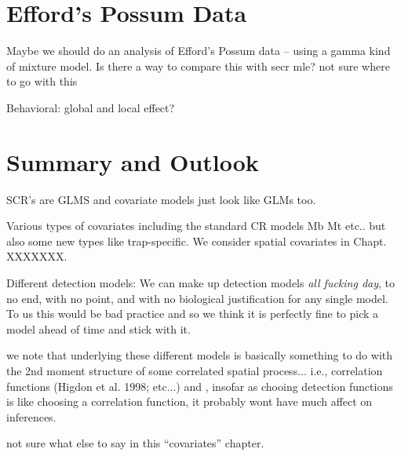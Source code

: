\section{Efford's Possum Data}

Maybe we should do an analysis of Efford's Possum data -- using a
gamma kind of mixture model.  Is there a way to compare this with secr
mle?
not sure where to go with this


Behavioral: global and local effect?


\section{Summary and Outlook}


SCR's are GLMS and covariate models just look like GLMs too.

Various types of covariates including the standard CR models Mb Mt etc..
but also some new types like trap-specific. We consider spatial covariates
in Chapt. XXXXXXX.


Different detection models: We can make up detection models {\it all fucking
day}, to no end, with no point, and with no biological justification for
any single model. To us this would be bad practice and so we think it is
perfectly fine to pick a model ahead of time and stick with it.

we note that underlying these different models is basically something
to do with the 2nd moment structure of some correlated spatial process...
i.e., correlation functions (Higdon et al. 1998; etc...) and , insofar
as chooing detection functions is like choosing a correlation function,
it probably wont have much affect on inferences.



not sure what else to say in this ``covariates'' chapter.



